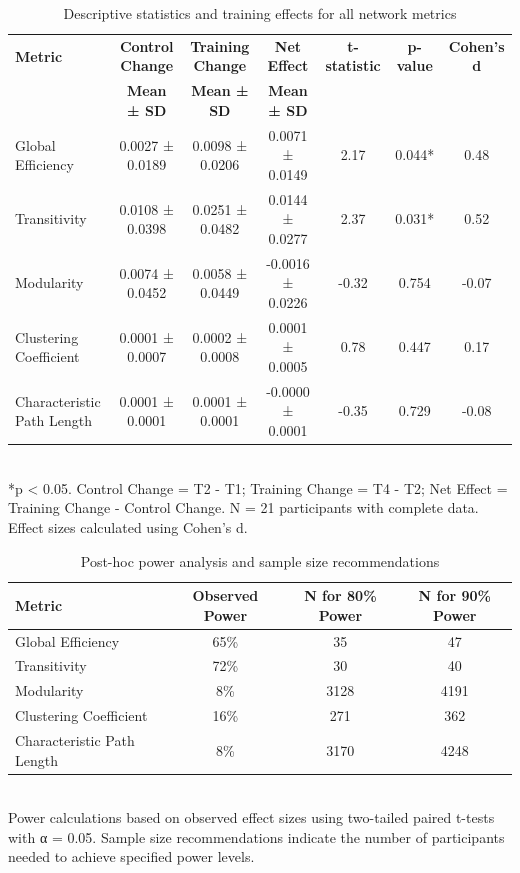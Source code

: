 \documentclass[12pt,a4paper]{article}
\begin{document}
\newpage

\begin{table}[H]
\centering
\caption{Descriptive statistics and training effects for all network metrics}
\label{tab:results}
\begin{tabular}{lcccccc}
\toprule
\textbf{Metric} & \textbf{Control Change} & \textbf{Training Change} & \textbf{Net Effect} & \textbf{t-statistic} & \textbf{p-value} & \textbf{Cohen's d} \\
 & \textbf{Mean ± SD} & \textbf{Mean ± SD} & \textbf{Mean ± SD} & & & \\
\midrule
Global Efficiency & 0.0027 ± 0.0189 & 0.0098 ± 0.0206 & 0.0071 ± 0.0149 & 2.17 & 0.044* & 0.48 \\
Transitivity & 0.0108 ± 0.0398 & 0.0251 ± 0.0482 & 0.0144 ± 0.0277 & 2.37 & 0.031* & 0.52 \\
Modularity & 0.0074 ± 0.0452 & 0.0058 ± 0.0449 & -0.0016 ± 0.0226 & -0.32 & 0.754 & -0.07 \\
Clustering Coefficient & 0.0001 ± 0.0007 & 0.0002 ± 0.0008 & 0.0001 ± 0.0005 & 0.78 & 0.447 & 0.17 \\
Characteristic Path Length & 0.0001 ± 0.0001 & 0.0001 ± 0.0001 & -0.0000 ± 0.0001 & -0.35 & 0.729 & -0.08 \\
\bottomrule
\end{tabular}
\\[0.5em]
\footnotesize
*p < 0.05. Control Change = T2 - T1; Training Change = T4 - T2; Net Effect = Training Change - Control Change. 
N = 21 participants with complete data. Effect sizes calculated using Cohen's d.
\end{table}

\begin{table}[H]
\centering
\caption{Post-hoc power analysis and sample size recommendations}
\label{tab:power}
\begin{tabular}{lccc}
\toprule
\textbf{Metric} & \textbf{Observed Power} & \textbf{N for 80\% Power} & \textbf{N for 90\% Power} \\
\midrule
Global Efficiency & 65\% & 35 & 47 \\
Transitivity & 72\% & 30 & 40 \\
Modularity & 8\% & 3128 & 4191 \\
Clustering Coefficient & 16\% & 271 & 362 \\
Characteristic Path Length & 8\% & 3170 & 4248 \\
\bottomrule
\end{tabular}
\\[0.5em]
\footnotesize
Power calculations based on observed effect sizes using two-tailed paired t-tests with α = 0.05.
Sample size recommendations indicate the number of participants needed to achieve specified power levels.
\end{table}
\end{document}
